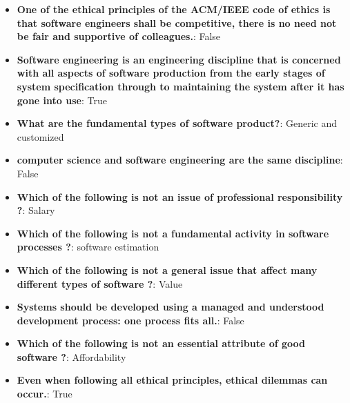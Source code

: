 \documentclass{report}
\begin{document}
    \begin{itemize}
        \item \textbf{One of the ethical principles of the ACM/IEEE code of ethics is that software engineers shall be competitive, there is no need not be fair and supportive of colleagues.}: False
        \item \textbf{Software engineering is an engineering discipline that is concerned with all aspects of software production from the early stages of system specification through to maintaining the system after it has gone into use}: True
        \item \textbf{What are the fundamental types of software product?}: Generic and customized
        \item \textbf{computer science and software engineering are the same discipline}: False
        \item \textbf{Which of the following is not an issue of professional responsibility ?}: Salary
        \item \textbf{Which of the following is not a fundamental activity in software processes ?}: software estimation
        \item \textbf{Which of the following is not a general issue that affect many different types of software ?}: Value
        \item \textbf{Systems should be developed using a managed and understood development process: one process fits all.}: False
        \item \textbf{Which of the following is not an essential attribute of good software ?}: Affordability
        \item \textbf{Even when following all ethical principles, ethical dilemmas can occur.}: True
    \end{itemize}
\end{document}
